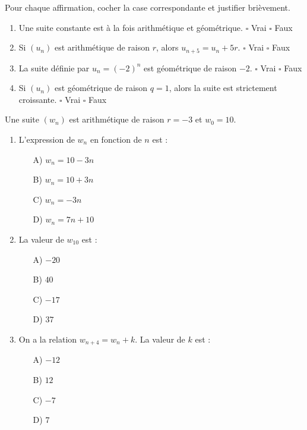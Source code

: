 \documentclass[11pt]{article}
\begin{document}
\begin{exercice}
Pour chaque affirmation, cocher la case correspondante et justifier brièvement.
\begin{enumerate}
    \item Une suite constante est à la fois arithmétique et géométrique. \hfill $\square$ Vrai \quad $\square$ Faux
    \item Si $(u_n)$ est arithmétique de raison $r$, alors $u_{n+5} = u_n + 5r$. \hfill $\square$ Vrai \quad $\square$ Faux
    \item La suite définie par $u_n = (-2)^n$ est géométrique de raison $-2$. \hfill $\square$ Vrai \quad $\square$ Faux
    \item Si $(u_n)$ est géométrique de raison $q=1$, alors la suite est strictement croissante. \hfill $\square$ Vrai \quad $\square$ Faux
\end{enumerate}
\end{exercice}

\begin{exercice}
Une suite $(w_n)$ est arithmétique de raison $r = -3$ et $w_0 = 10$.
\begin{enumerate}
    \item L'expression de $w_n$ en fonction de $n$ est :
    \begin{itemize}
        \item[A)] $w_n = 10 - 3n$
        \item[B)] $w_n = 10 + 3n$
        \item[C)] $w_n = -3n$
        \item[D)] $w_n = 7n + 10$
    \end{itemize}
    \item La valeur de $w_{10}$ est :
    \begin{itemize}
        \item[A)] $-20$
        \item[B)] $40$
        \item[C)] $-17$
        \item[D)] $37$
    \end{itemize}
    \item On a la relation $w_{n+4} = w_n + k$. La valeur de $k$ est :
    \begin{itemize}
        \item[A)] $-12$
        \item[B)] $12$
        \item[C)] $-7$
        \item[D)] $7$
    \end{itemize}
\end{enumerate}
\end{exercice}
\end{document}
